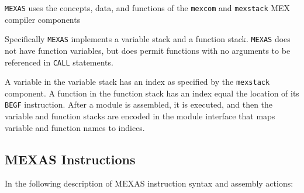 \documentclass[12pt]{article}
\begin{document}
{\tt MEXAS} uses the concepts, data, and functions of the
{\tt mexcom} and {\tt mexstack} MEX compiler components

Specifically {\tt MEXAS} implements a variable stack and a function stack.
{\tt MEXAS} does not have function variables, but does permit functions
with no arguments to be referenced in {\tt CALL} statements.

A variable in the variable stack has an index as specified by the
{\tt mexstack} component.  A function in the function stack
has an index equal the location of its {\tt BEGF} instruction.
After a module is assembled,
it is executed, and then the variable and function stacks are
encoded in the module interface that maps variable and function names
to indices.


\subsection{MEXAS Instructions}
\label{MEXAS-INSTRUCTIONS}

In the following description of MEXAS instruction syntax and
assembly actions:
\end{document}
